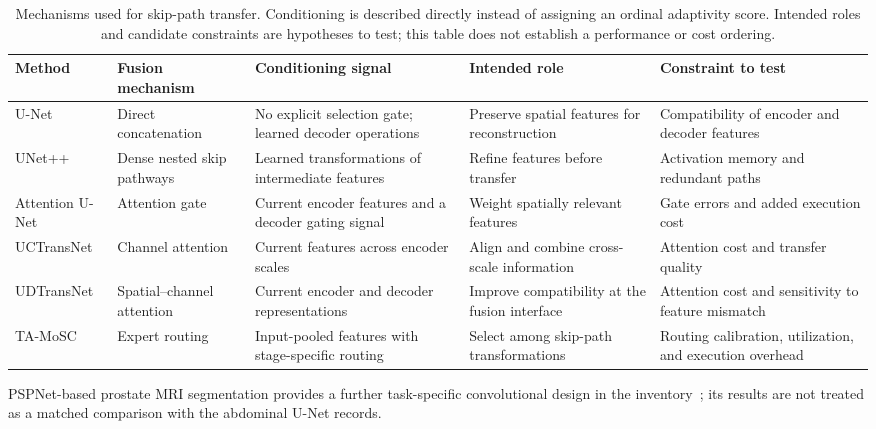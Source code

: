 \documentclass[5p,times,authoryear]{elsarticle}
\begin{document}
\begin{table}[t]
\centering\footnotesize
\setlength{\tabcolsep}{4pt}\renewcommand{\arraystretch}{1.14}
\begin{tabularx}{\textwidth}{>{\raggedright\arraybackslash}p{2.65cm}>{\raggedright\arraybackslash}p{2.5cm}>{\raggedright\arraybackslash}p{3.4cm}>{\raggedright\arraybackslash}p{3.5cm}>{\raggedright\arraybackslash}X}
\toprule
\textbf{Method} & \textbf{Fusion mechanism} & \textbf{Conditioning signal} & \textbf{Intended role} & \textbf{Constraint to test} \\
\midrule
U-Net \citep{ronneberger2015unet} & Direct concatenation & No explicit selection gate; learned decoder operations & Preserve spatial features for reconstruction & Compatibility of encoder and decoder features \\
UNet++ \citep{zhou2018unetplusplus} & Dense nested skip pathways & Learned transformations of intermediate features & Refine features before transfer & Activation memory and redundant paths \\
Attention U-Net \citep{oktay2018attentionunet} & Attention gate & Current encoder features and a decoder gating signal & Weight spatially relevant features & Gate errors and added execution cost \\
UCTransNet \citep{wang2022uctransnet} & Channel attention & Current features across encoder scales & Align and combine cross-scale information & Attention cost and transfer quality \\
UDTransNet \citep{wang2024udtransnet} & Spatial--channel attention & Current encoder and decoder representations & Improve compatibility at the fusion interface & Attention cost and sensitivity to feature mismatch \\
TA-MoSC \citep{luo2025tamosc_verified} & Expert routing & Input-pooled features with stage-specific routing & Select among skip-path transformations & Routing calibration, utilization, and execution overhead \\
\bottomrule
\end{tabularx}
\caption{Mechanisms used for skip-path transfer. Conditioning is described directly instead of assigning an ordinal adaptivity score. Intended roles and candidate constraints are hypotheses to test; this table does not establish a performance or cost ordering.}
\label{table:skip_connections}
\end{table}

PSPNet-based prostate MRI segmentation provides a further task-specific convolutional design in the inventory~\citep{yan2021psp}; its results are not treated as a matched comparison with the abdominal U-Net records.
\end{document}
